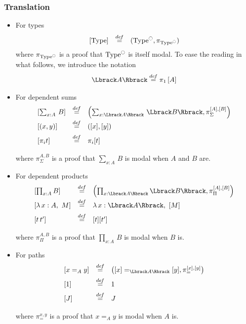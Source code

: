 \documentclass{beamer}
\newcommand \defeq {\overset{de\hspace{-0.2ex}f}{=}}
\DeclareMathOperator{\Type}{Type}
\newcommand{\modal}{\ensuremath{\ocircle}}
\newcommand{\sumD}[3]{\sum_{#1:#2}\, #3}
\newcommand{\prodD}[3]{\prod_{#1:#2}\, #3}
\begin{document}
\begin{frame}
  \frametitle{Translation}
  \begin{itemize}
  \item For types
    \[
    \begin{array}{lcl}
      \left[ \Type\right] &\defeq& (\Type^\modal,\pi_{\Type^\modal})
    \end{array}
    \]
    where $\pi_{\Type^\modal}$ is a proof that $\Type^\modal$ is itself
    modal.
    To ease the reading in what follows, we introduce the notation  \[ 
    \Lbrack A \Rbrack \defeq \pi_1 \left[ A \right]\]

  \item For dependent sums
    \[
    \begin{array}{lcl}
      \left[ \sumD x A B \right] &\defeq&  \left( \sumD x{\Lbrack A \Rbrack}
        {\Lbrack B\Rbrack} , \pi_\Sigma^{[A],[B]}
      \right)\\[0.5em]
      \left[  (x,y)\right] &\defeq& ([x],[y]) \\[0.5em]
      \left[  \pi_i t\right] &\defeq& \pi_i [t] \\[0.5em]
    \end{array}
    \]
    where $\pi_{\Sigma}^{A,B}$ is a proof that $\sumD x A B$ is modal when
    $A$ and $B$ are.
  \end{itemize}
\end{frame}
\begin{frame}
  \begin{itemize}
  \item For dependent products
    \[
    \begin{array}{lcl}
      \left[ \prod_{x:A} B \right] &\defeq& \left( \prod_{x:\Lbrack A \Rbrack}
        \Lbrack B\Rbrack , \pi_{\Pi}^{[A],[B]}
      \right)\\[0.5em]
      \left[  \lambda\, x:A,~M \right] &\defeq&\lambda\,x:\Lbrack A
      \Rbrack,~[ M ]
      \\[0.5em]
      \left[ t \, t' \right] &\defeq& [t] [t'] \\[0.5em]
    \end{array}
    \]
    where $\pi_{\Pi}^{A,B}$ is a proof that $\prodD x A B$ is modal when $B$ is.
  \item For paths
    \[
    \begin{array}{lcl}
      \left[  x=_A y \right] &\defeq& \left( [x] =_{\Lbrack A\Rbrack} [y] , \pi_=^{[x],[y]}
      \right)\\[0.5em]
      \left[ 1 \right] &\defeq& 1\\[0.5em]
      \left[ J \right] &\defeq& J \\[0.5em]
    \end{array}
    \]
    where $\pi_{=}^{x,y}$ is a proof that $x=_A y$ is modal when $A$
    is.
 \end{itemize}
\end{frame}
\end{document}
